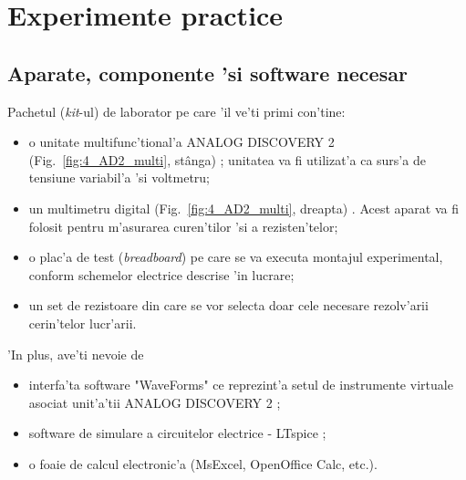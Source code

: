 %

\section{Experimente practice}

\subsection*{Aparate, componente 'si software necesar}

Pachetul ({\em kit}-ul) de laborator pe care 'il ve'ti primi con'tine: 
\begin{itemize}
\item o unitate multifunc'tional'a ANALOG DISCOVERY 2 (Fig.~\ref{fig:4_AD2_multi}, st\^anga) \cite{ad2_refman}; unitatea va fi utilizat'a ca surs'a de tensiune variabil'a 'si voltmetru;
\item un multimetru digital (Fig.~\ref{fig:4_AD2_multi}, dreapta) \cite{multimeter_manual}. Acest aparat va fi folosit pentru m'asurarea curen'tilor 'si a rezisten'telor;
\item o plac'a de test ({\em breadboard}) pe care se va executa montajul experimental, conform schemelor electrice descrise 'in lucrare;
\item un set de rezistoare din care se vor selecta doar cele necesare rezolv'arii cerin'telor lucr'arii.
\end{itemize}
'In plus, ave'ti nevoie de
\begin{itemize}
\item interfa'ta software "WaveForms" ce reprezint'a setul de instrumente virtuale asociat unit'a'tii ANALOG DISCOVERY 2 \cite{wavef_refman} ; 
\item software de simulare a circuitelor electrice - LTspice \cite{ltspice};
\item o foaie de calcul electronic'a (MsExcel, OpenOffice Calc, etc.).
\end{itemize}
